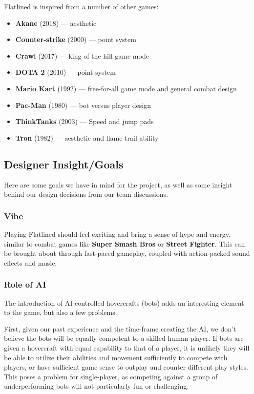 \documentclass{article}
\newcommand{\name}{Flatlined}
\theoremstyle{definition}
\begin{document}
\name{} is inspired from a number of other games:
\begin{itemize}
  \item \textbf{Akane} (2018) --- aesthetic
  \item \textbf{Counter-strike} (2000) --- point system
  \item \textbf{Crawl} (2017) --- king of the hill game mode
  \item \textbf{DOTA 2} (2010) --- point system
  \item \textbf{Mario Kart} (1992) --- free-for-all game mode and general combat design
  \item \textbf{Pac-Man} (1980) --- bot versus player design
  \item \textbf{ThinkTanks} (2003) --- Speed and jump pads
  \item \textbf{Tron} (1982) --- aesthetic and flame trail ability
\end{itemize}

\subsection{Designer Insight/Goals}

Here are some goals we have in mind for the project, as well as some insight
behind our design decisions from our team discussions.

\subsubsection{Vibe}

Playing \name{} should feel exciting and bring a sense of hype and energy,
similar to combat games like \textbf{Super Smash Bros} or \textbf{Street
Fighter}. This can be brought about through fast-paced gameplay, coupled with
action-packed sound effects and music.

\subsubsection{Role of AI}

The introduction of AI-controlled hovercrafts (bots) adds an interesting
element to the game, but also a few problems.

First, given our past experience and the time-frame creating the AI, we don't
believe the bots will be equally competent to a skilled human player. If bots
are given a hovercraft with equal capability to that of a player, it is
unlikely they will be able to utilize their abilities and movement sufficiently
to compete with players, or have sufficient game sense to outplay and counter
different play styles. This poses a problem for single-player, as competing
against a group of underperforming bots will not particularly fun or
challenging.
\end{document}
